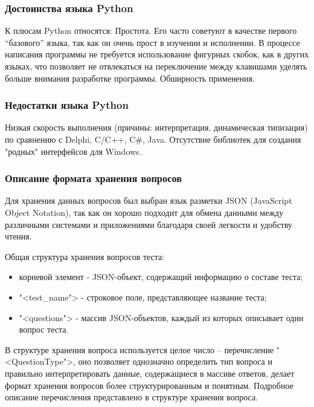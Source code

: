 \subsubsection{Достоинства языка Python}

К плюсам Python относятся: Простота. Его часто советуют в качестве первого “базового” языка, так как он очень прост в изучении и исполнении. В процессе написания программы не требуется использование фигурных скобок, как в других языках, что позволяет не отвлекаться на переключение между клавишами уделять больше внимания разработке программы. Обширность применения.

\subsubsection{Недостатки языка Python}

Низкая скорость выполнения (причины: интерпретация, динамическая типизация) по сравнению с Delphi, C/C++, C\#, Java.
Отсутствие библиотек для создания "родных" интерфейсов для Windows.

\subsubsection{Описание формата хранения вопросов}

Для хранения данных вопросов был выбран язык разметки JSON (JavaScript Object Notation), так как он хорошо подходит для обмена данными между различными системами и приложениями благодаря своей легкости и удобству чтения.

Общая структура хранения вопросов теста:
\begin{itemize}
	\item корневой элемент - JSON-объект, содержащий информацию о составе теста;
	\item "<test\_name"> - строковое поле, представляющее название теста;
	\item "<questions"> - массив JSON-объектов, каждый из которых описывает один вопрос теста.
\end{itemize}

В структуре хранения вопроса используется целое число -- перечисление "<QuestionType">, оно позволяет однозначно определить тип вопроса и правильно интерпретировать данные, содержащиеся в массиве ответов, делает формат хранения вопросов более структурированным и понятным. Подробное описание перечисления представлено в структуре хранения вопроса.

